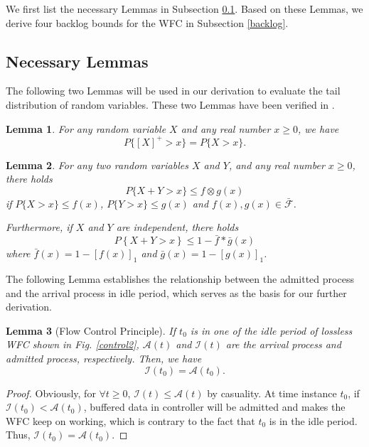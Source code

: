 \documentclass[paper]{ieice}
\newtheorem{lemma}{Lemma}
\newtheorem{proof}{Proof}
\begin{document}
We first list the necessary Lemmas in Subsection \ref{neclemma}. Based on these Lemmas, we derive four backlog bounds for the WFC in Subsection \ref{backlog}.
\subsection{Necessary Lemmas}\label{neclemma}
The following two Lemmas will be used in our derivation to evaluate the tail distribution of random variables. These two Lemmas have been verified in \cite{jiang2006basic}.
\begin{lemma}\label{lamma1}
For any random variable $X$ and any real number $x\geq 0$, we have $$P\{[X]^+>x\}=P\{X>x\}.$$
\end{lemma}

\begin{lemma}\label{lamma3}
For any two random variables $X$ and $Y$, and any real number $x\geq 0$, there holds
$$P\{X+Y>x\}\leq f\otimes g(x)$$
if $P\{X>x\}\leq f(x)$, $P\{Y>x\}\leq g(x)$ and $f(x),g(x)\in\bar{\mathcal{F}}$.

Furthermore, if $X$ and $Y$ are independent, there holds
$$P\left\{X+Y>x\right\}\leq 1-\bar{f}\ast\bar{g}(x)$$
where $\bar{f}(x)=1-[f(x)]_1$ and $\bar{g}(x)=1-[g(x)]_1$.
\end{lemma}

The following Lemma establishes the relationship between the admitted process and the arrival process in idle period, which serves as the basis for our further derivation.
\begin{lemma}[Flow Control Principle]\label{lama1}
If $t_0$ is in one of the idle period of lossless WFC shown in Fig. \ref{control2}, $\mathcal{A}(t)$ and $\mathcal{I}(t)$ are the arrival process and admitted process, respectively. Then, we have
\begin{equation}
\mathcal{I}(t_0)=\mathcal{A}(t_0).
\end{equation}
\end{lemma}
\begin{proof}
Obviously, for $\forall t\geq 0$, $\mathcal{I}(t)\leq \mathcal{A}(t)$ by casuality. At time instance $t_0$, if $\mathcal{I}(t_0)<\mathcal{A}(t_0)$, buffered data in controller will be admitted and makes the WFC keep on working, which is contrary to the fact that $t_0$ is in the idle period. Thus, $\mathcal{I}(t_0)=\mathcal{A}(t_0)$.\QED
\end{proof}
\end{document}
